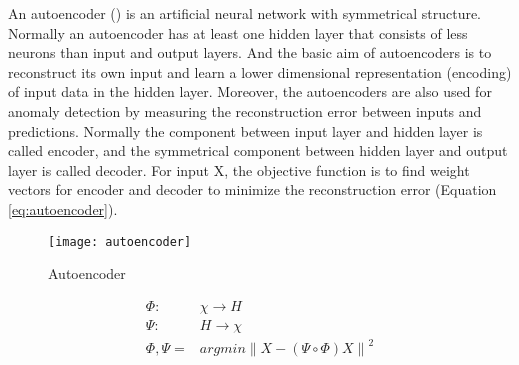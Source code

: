An autoencoder () is an artificial neural network with symmetrical structure. Normally an autoencoder has at least one hidden layer that consists of less neurons than input and output layers. And the basic aim of autoencoders is to reconstruct its own input and learn a lower dimensional representation (encoding) of input data in the hidden layer. Moreover, the autoencoders are also used for anomaly detection by measuring the reconstruction error between inputs and predictions.
Normally the component between input layer and hidden layer is called encoder, and the symmetrical component between hidden layer and output layer is called decoder. For input X, the objective function is to find weight vectors for encoder and decoder to minimize the reconstruction error (Equation \ref{eq:autoencoder}).\\

\begin{figure}[h]
\centering
\texttt{[image: autoencoder]}
\caption[Autoencoder]{Autoencoder}
\label{fig:autoencoder}
\end{figure}

\begin{equation} \label{eq:autoencoder}
\begin{aligned}
\Phi : &\chi \rightarrow H \\
\Psi : &H \rightarrow \chi \\
\Phi, \Psi = &argmin \left \| X-(\Psi \circ \Phi)X \right \|^2
\end{aligned}
\end{equation}

